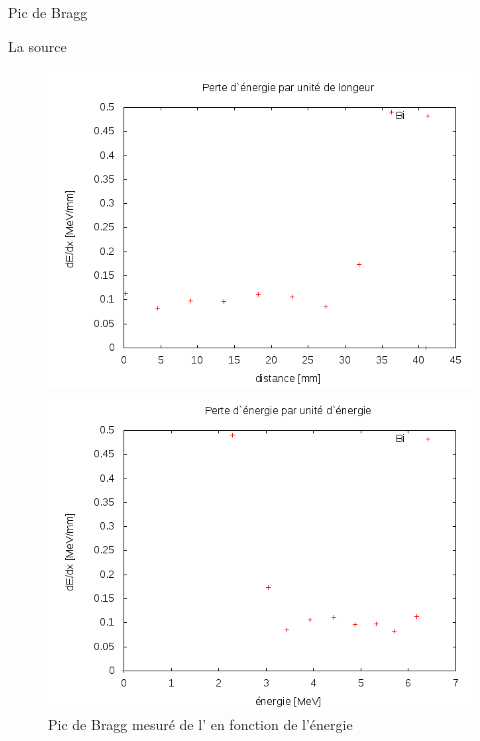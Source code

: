 \documentclass[a4paper,11pt,liststotocnumbered,bibtotocnumbered]{scrartcl}
\begin{document}
\begin{section}{Pic de Bragg}
   \begin{subsection}{La source }
  \begin{figure}[H]
   \begin{minipage}{0.45\textwidth}
    \includegraphics[width=\textwidth]{Sabine/bipic.png}
    \caption{Pic de Bragg mesuré de l'  en fonction de la distance}
   \end{minipage}
   \hfill
   \begin{minipage}{0.45\textwidth}
    \includegraphics[width=\textwidth]{Sabine/bipic2.png}
    \caption{Pic de Bragg mesuré de l'  en fonction de l'énergie}
   \end{minipage}
  \end{figure}

\end{subsection}
\end{section}
\end{document}
